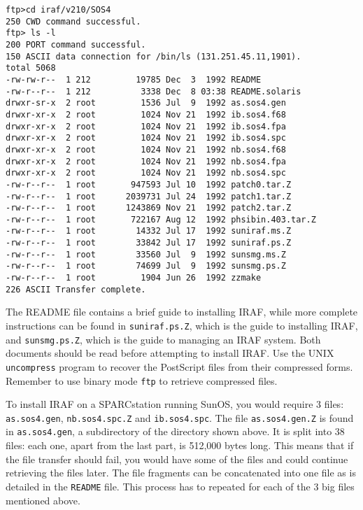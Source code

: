 {\footnotesize
\begin{verbatim}
ftp>cd iraf/v210/SOS4
250 CWD command successful.
ftp> ls -l   
200 PORT command successful.
150 ASCII data connection for /bin/ls (131.251.45.11,1901).
total 5068
-rw-rw-r--  1 212         19785 Dec  3  1992 README
-rw-r--r--  1 212          3338 Dec  8 03:38 README.solaris
drwxr-sr-x  2 root         1536 Jul  9  1992 as.sos4.gen
drwxr-xr-x  2 root         1024 Nov 21  1992 ib.sos4.f68
drwxr-xr-x  2 root         1024 Nov 21  1992 ib.sos4.fpa
drwxr-xr-x  2 root         1024 Nov 21  1992 ib.sos4.spc
drwxr-xr-x  2 root         1024 Nov 21  1992 nb.sos4.f68
drwxr-xr-x  2 root         1024 Nov 21  1992 nb.sos4.fpa
drwxr-xr-x  2 root         1024 Nov 21  1992 nb.sos4.spc
-rw-r--r--  1 root       947593 Jul 10  1992 patch0.tar.Z
-rw-r--r--  1 root      2039731 Jul 24  1992 patch1.tar.Z
-rw-r--r--  1 root      1243869 Nov 21  1992 patch2.tar.Z
-rw-r--r--  1 root       722167 Aug 12  1992 phsibin.403.tar.Z
-rw-r--r--  1 root        14332 Jul 17  1992 suniraf.ms.Z
-rw-r--r--  1 root        33842 Jul 17  1992 suniraf.ps.Z
-rw-r--r--  1 root        33560 Jul  9  1992 sunsmg.ms.Z
-rw-r--r--  1 root        74699 Jul  9  1992 sunsmg.ps.Z
-rw-r--r--  1 root         1904 Jun 26  1992 zzmake
226 ASCII Transfer complete.

\end{verbatim}
} 

The README file contains a brief guide to installing IRAF, while more
complete instructions can be found in {\tt suniraf.ps.Z}, which is the
guide to installing IRAF, and {\tt sunsmg.ps.Z}, which is the guide to
managing an IRAF system. Both documents should be read before
attempting to install IRAF. Use the UNIX {\tt uncompress} program
to recover the PostScript files from their compressed forms. Remember
to use binary mode {\tt ftp} to retrieve compressed files.

To install IRAF on a SPARCstation running SunOS, you would require 3
files: {\tt as.sos4.gen}, {\tt nb.sos4.spc.Z} and {\tt ib.sos4.spc}.
The file {\tt as.sos4.gen.Z} is found in
{\tt as.sos4.gen}, a subdirectory
of the directory shown above. It is split into 38
files: each one, apart from the last part, is 512,000 bytes long. This
means that if the file transfer should fail, you would have some of
the files and could continue retrieving the files later. The file
fragments can be concatenated into one file as is detailed in the
{\tt README} file. This process has to repeated for each of the 3 big files
mentioned above.

